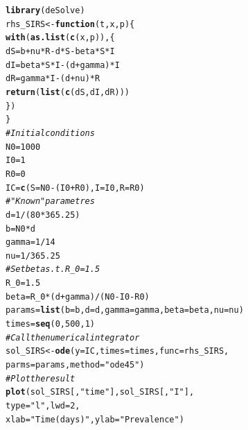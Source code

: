 \documentclass[aspectratio=169]{beamer}\usepackage[]{graphicx}\usepackage[]{xcolor}
\makeatletter
\newcommand{\hlnum}[1]{\textcolor[rgb]{0.686,0.059,0.569}{#1}}%
\newcommand{\hlsng}[1]{\textcolor[rgb]{0.192,0.494,0.8}{#1}}%
\newcommand{\hlcom}[1]{\textcolor[rgb]{0.678,0.584,0.686}{\textit{#1}}}%
\newcommand{\hlopt}[1]{\textcolor[rgb]{0,0,0}{#1}}%
\newcommand{\hldef}[1]{\textcolor[rgb]{0.345,0.345,0.345}{#1}}%
\newcommand{\hlkwa}[1]{\textcolor[rgb]{0.161,0.373,0.58}{\textbf{#1}}}%
\newcommand{\hlkwb}[1]{\textcolor[rgb]{0.69,0.353,0.396}{#1}}%
\newcommand{\hlkwc}[1]{\textcolor[rgb]{0.333,0.667,0.333}{#1}}%
\newcommand{\hlkwd}[1]{\textcolor[rgb]{0.737,0.353,0.396}{\textbf{#1}}}%
\newenvironment{kframe}{%
 \def\at@end@of@kframe{}%
 \ifinner\ifhmode%
  \def\at@end@of@kframe{\end{minipage}}%
  \begin{minipage}{\columnwidth}%
 \fi\fi%
 \def\FrameCommand##1{\hskip\@totalleftmargin \hskip-\fboxsep
 \colorbox{shadecolor}{##1}\hskip-\fboxsep
     \hskip-\linewidth \hskip-\@totalleftmargin \hskip\columnwidth}%
 \MakeFramed {\advance\hsize-\width
   \@totalleftmargin\z@ \linewidth\hsize
   \@setminipage}}%
 {\par\unskip\endMakeFramed%
 \at@end@of@kframe}
\newenvironment{knitrout}{}{} %
\makeatother
\begin{document}
\begin{knitrout}
\color{fgcolor}\begin{kframe}
\begin{alltt}
\hlkwd{library}\hldef{(deSolve)}
\hldef{rhs_SIRS} \hlkwb{<-} \hlkwa{function}\hldef{(}\hlkwc{t}\hldef{,} \hlkwc{x}\hldef{,} \hlkwc{p}\hldef{) \{}
  \hlkwd{with}\hldef{(}\hlkwd{as.list}\hldef{(}\hlkwd{c}\hldef{(x, p)), \{}
    \hldef{dS} \hlkwb{=} \hldef{b} \hlopt{+} \hldef{nu} \hlopt{*} \hldef{R} \hlopt{-} \hldef{d} \hlopt{*} \hldef{S} \hlopt{-} \hldef{beta} \hlopt{*} \hldef{S} \hlopt{*} \hldef{I}
    \hldef{dI} \hlkwb{=} \hldef{beta} \hlopt{*} \hldef{S} \hlopt{*} \hldef{I} \hlopt{-} \hldef{(d} \hlopt{+} \hldef{gamma)} \hlopt{*} \hldef{I}
    \hldef{dR} \hlkwb{=} \hldef{gamma} \hlopt{*} \hldef{I} \hlopt{-} \hldef{(d} \hlopt{+} \hldef{nu)} \hlopt{*} \hldef{R}
    \hlkwd{return}\hldef{(}\hlkwd{list}\hldef{(}\hlkwd{c}\hldef{(dS, dI, dR)))}
  \hldef{\})}
\hldef{\}}
\hlcom{# Initial conditions}
\hldef{N0} \hlkwb{=} \hlnum{1000}
\hldef{I0} \hlkwb{=} \hlnum{1}
\hldef{R0} \hlkwb{=} \hlnum{0}
\hldef{IC} \hlkwb{=} \hlkwd{c}\hldef{(}\hlkwc{S} \hldef{= N0}\hlopt{-}\hldef{(I0}\hlopt{+}\hldef{R0),} \hlkwc{I} \hldef{= I0,} \hlkwc{R} \hldef{= R0)}
\hlcom{# "Known" parametres}
\hldef{d} \hlkwb{=} \hlnum{1}\hlopt{/}\hldef{(}\hlnum{80}\hlopt{*}\hlnum{365.25}\hldef{)}
\hldef{b} \hlkwb{=} \hldef{N0} \hlopt{*} \hldef{d}
\hldef{gamma} \hlkwb{=} \hlnum{1}\hlopt{/}\hlnum{14}
\hldef{nu} \hlkwb{=} \hlnum{1}\hlopt{/}\hlnum{365.25}
\hlcom{# Set beta s.t. R_0 = 1.5}
\hldef{R_0} \hlkwb{=} \hlnum{1.5}
\hldef{beta} \hlkwb{=} \hldef{R_0} \hlopt{*} \hldef{(d} \hlopt{+} \hldef{gamma)} \hlopt{/} \hldef{(N0}\hlopt{-}\hldef{I0}\hlopt{-}\hldef{R0)}
\hldef{params} \hlkwb{=} \hlkwd{list}\hldef{(}\hlkwc{b} \hldef{= b,} \hlkwc{d} \hldef{= d,} \hlkwc{gamma} \hldef{= gamma,} \hlkwc{beta} \hldef{= beta,} \hlkwc{nu} \hldef{= nu)}
\hldef{times} \hlkwb{=} \hlkwd{seq}\hldef{(}\hlnum{0}\hldef{,} \hlnum{500}\hldef{,} \hlnum{1}\hldef{)}
\hlcom{# Call the numerical integrator}
\hldef{sol_SIRS} \hlkwb{<-} \hlkwd{ode}\hldef{(}\hlkwc{y} \hldef{= IC,} \hlkwc{times} \hldef{= times,} \hlkwc{func} \hldef{= rhs_SIRS,}
                \hlkwc{parms} \hldef{= params,} \hlkwc{method} \hldef{=} \hlsng{"ode45"}\hldef{)}
\hlcom{# Plot the result}
\hlkwd{plot}\hldef{(sol_SIRS[,}\hlsng{"time"}\hldef{], sol_SIRS[,}\hlsng{"I"}\hldef{],}
     \hlkwc{type} \hldef{=} \hlsng{"l"}\hldef{,} \hlkwc{lwd} \hldef{=} \hlnum{2}\hldef{,}
     \hlkwc{xlab} \hldef{=} \hlsng{"Time (days)"}\hldef{,} \hlkwc{ylab} \hldef{=} \hlsng{"Prevalence"}\hldef{)}
\end{alltt}
\end{kframe}
\end{knitrout}
\end{document}
